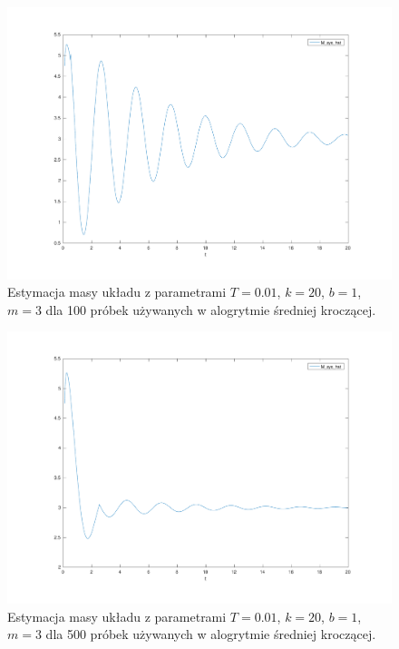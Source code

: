 \documentclass[a4paper]{article}
\begin{document}
\begin{figure}[H]
	\includegraphics[width=0.99\linewidth]{systemfs100_mass}
	\centering
	\caption{Estymacja masy układu z parametrami $T=0.01$, $k = 20$, $b = 1$, $m = 3$ dla 100 próbek używanych w alogrytmie średniej kroczącej.}
	\label{fig:systemfs100_mass}
\end{figure}

\begin{figure}[H]
	\includegraphics[width=0.99\linewidth]{systemfs500_mass}
	\centering
	\caption{Estymacja masy układu z parametrami $T=0.01$, $k = 20$, $b = 1$, $m = 3$ dla 500 próbek używanych w alogrytmie średniej kroczącej.}
	\label{fig:systemfs500_mass}
\end{figure}
\end{document}
